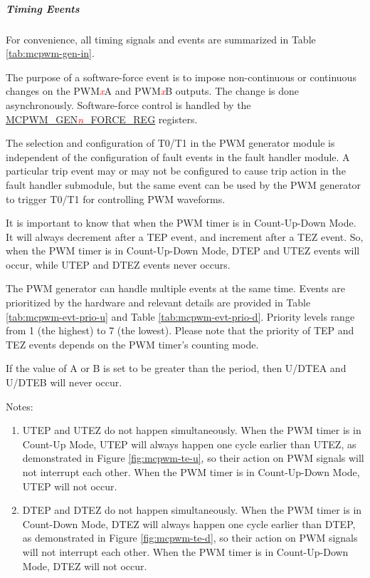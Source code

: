 \documentclass[main\_\_EN.tex]{subfiles}
\begin{document}
\subparagraph{Timing Events}
\label{subpara:mcpwm-op-evt}
For convenience, all timing signals and events are summarized in Table \ref{tab:mcpwm-gen-in}.


The purpose of a software-force event is to impose non-continuous or continuous changes on the PWM\textcolor{red}{\it{x}}A and PWM\textcolor{red}{\it{x}}B outputs. The change is done asynchronously. Software-force control is handled by the\\ \hyperref[regdesc:MCPWMGENNFORCEREG]{MCPWM\_GEN\textcolor{red}{\it{n}}\_FORCE\_REG} registers.

The selection and configuration of T0/T1 in the PWM generator module is independent of the configuration of fault events in the fault handler module. A particular trip event may or may not be configured to cause trip action in the fault handler submodule, but the same event can be used by the PWM generator to trigger T0/T1 for controlling PWM waveforms.

It is important to know that when the PWM timer is in Count-Up-Down Mode. It will always decrement after a TEP event, and increment after a TEZ event. So, when the PWM timer is in Count-Up-Down Mode, DTEP and UTEZ events will occur, while UTEP and DTEZ events never occurs.

The PWM generator can handle multiple events at the same time. Events are prioritized by the hardware and relevant details are provided in Table \ref{tab:mcpwm-evt-prio-u} and Table \ref{tab:mcpwm-evt-prio-d}. Priority levels range from 1 (the highest) to 7 (the lowest). Please note that the priority of TEP and TEZ events depends on the PWM timer's counting mode.

If the value of A or B is set to be greater than the period, then U/DTEA and U/DTEB will never occur.




Notes:
\begin{enumerate}
   \item UTEP and UTEZ do not happen simultaneously. When the PWM timer is in Count-Up Mode, UTEP will always happen one cycle earlier than UTEZ, as demonstrated in Figure \ref{fig:mcpwm-te-u}, so their action on PWM signals will not interrupt each other. When the PWM timer is in Count-Up-Down Mode, UTEP will not occur.
    \item DTEP and DTEZ do not happen simultaneously. When the PWM timer is in Count-Down Mode, DTEZ will always happen one cycle earlier than DTEP, as demonstrated in Figure \ref{fig:mcpwm-te-d}, so their action on PWM signals will not interrupt each other. When the PWM timer is in Count-Up-Down Mode, DTEZ will not occur.
\end{enumerate}
\end{document}
